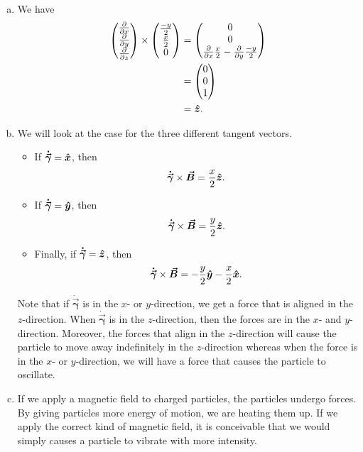 \documentclass[12pt]{article} %
\newcommand{\tangentgamma}{\boldsymbol{\dot{\vec{\gamma}}}}
\newcommand{\vecfieldB}{\boldsymbol{\vec{B}}}
\begin{document}
\begin{solution}~
\begin{enumerate}[(a)]
    \item We have
    \begin{align*}
        \begin{pmatrix} \frac{\partial}{\partial x} \\ \frac{\partial}{\partial y} \\ \frac{\partial}{\partial z} \end{pmatrix} \times \begin{pmatrix} \frac{-y}{2} \\ \frac{x}{2} \\ 0 \end{pmatrix} &= \begin{pmatrix} 0 \\ 0 \\   \frac{\partial}{\partial x} \frac{x}{2} - \frac{\partial}{\partial y} \frac{-y}{2} \end{pmatrix} \\
                &= \begin{pmatrix} 0 \\ 0 \\ 1 \end{pmatrix}\\
                &= \boldsymbol{\hat{z}}.
    \end{align*}
    \item We will look at the case for the three different tangent vectors.
    \begin{itemize}
        \item If $\tangentgamma = \xhat$, then
        \[
        \tangentgamma \times \vecfieldB = \frac{x}{2}\zhat.
        \]
        \item If $\tangentgamma = \yhat$, then
        \[
        \tangentgamma \times \vecfieldB = \frac{y}{2} \zhat.
        \]
        \item Finally, if $\tangentgamma =\zhat$, then
        \[
        \tangentgamma \times \vecfieldB = -\frac{y}{2}\yhat -\frac{x}{2}\xhat.
        \]
    \end{itemize}
    Note that if $\tangentgamma$ is in the $x$- or $y$-direction, we get a force that is aligned in the $z$-direction.  When $\tangentgamma$ is in the $z$-direction, then the forces are in the $x$- and $y$-direction. Moreover, the forces that align in the $z$-direction will cause the particle to move away indefinitely in the $z$-direction whereas when the force is in the $x$- or $y$-direction, we will have a force that causes the particle to oscillate.

    \item If we apply a magnetic field to charged particles, the particles undergo forces. By giving particles more energy of motion, we are heating them up.  If we apply the correct kind of magnetic field, it is conceivable that we would simply causes a particle to vibrate with more intensity.
\end{enumerate}
\end{solution}
\end{document}

